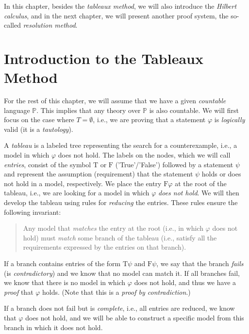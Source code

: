 In this chapter, besides the \emph{tableaux method}, we will also introduce the \emph{Hilbert calculus}, and in the next chapter, we will present another proof system, the so-called \emph{resolution method}.

\section{Introduction to the Tableaux Method}

For the rest of this chapter, we will assume that we have a given \emph{countable} language $\mathbb{P}$. This implies that any theory over $\mathbb{P}$ is also countable. We will first focus on the case where $T = \emptyset$, i.e., we are proving that a statement $\varphi$ is \emph{logically} valid (it is a \emph{tautology}). 

A \emph{tableau} is a labeled tree representing the search for a counterexample, i.e., a model in which $\varphi$ does not hold. The labels on the nodes, which we will call \emph{entries}, consist of the symbol $\mathrm{T}$ or $\mathrm{F}$ ('True'/'False') followed by a statement $\psi$ and represent the assumption (requirement) that the statement $\psi$ holds or does not hold in a model, respectively. We place the entry $\mathrm{F}\varphi$ at the root of the tableau, i.e., we are looking for a model in which $\varphi$ \emph{does not hold}. We will then develop the tableau using rules for \emph{reducing} the entries. These rules ensure the following invariant:
\begin{quote}
    Any model that \emph{matches} the entry at the root (i.e., in which $\varphi$ does not hold) must \emph{match} some branch of the tableau (i.e., satisfy all the requirements expressed by the entries on that branch).
\end{quote}
If a branch contains entries of the form $\mathrm{T}\psi$ and $\mathrm{F}\psi$, we say that the branch \emph{fails} (is \emph{contradictory}) and we know that no model can match it. If all branches fail, we know that there is no model in which $\varphi$ does not hold, and thus we have a \emph{proof} that $\varphi$ holds. (Note that this is a \emph{proof by contradiction}.)

If a branch does not fail but is \emph{complete}, i.e., all entries are reduced, we know that $\varphi$ does not hold, and we will be able to construct a specific model from this branch in which it does not hold.

